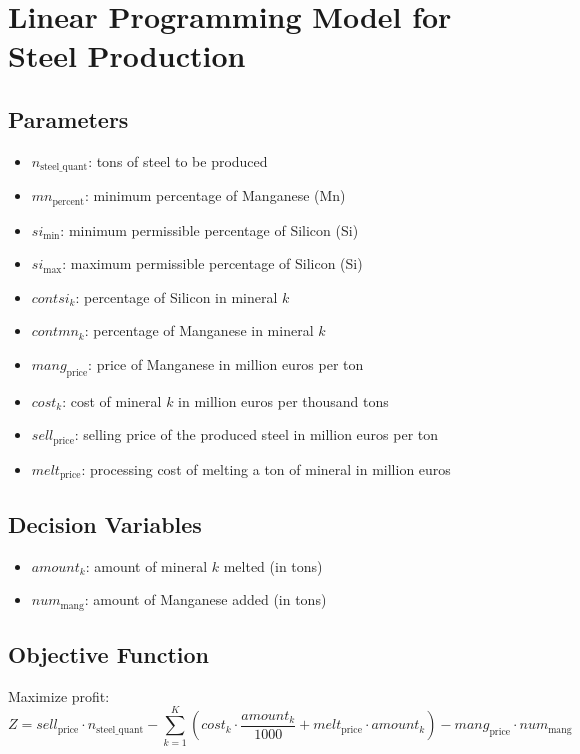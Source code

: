 \documentclass{article}
\begin{document}
\section*{Linear Programming Model for Steel Production}

\subsection*{Parameters}
\begin{itemize}
    \item $n_{\text{steel\_quant}}$: tons of steel to be produced
    \item $mn_{\text{percent}}$: minimum percentage of Manganese (Mn)
    \item $si_{\text{min}}$: minimum permissible percentage of Silicon (Si)
    \item $si_{\text{max}}$: maximum permissible percentage of Silicon (Si)
    \item $contsi_k$: percentage of Silicon in mineral $k$
    \item $contmn_k$: percentage of Manganese in mineral $k$
    \item $mang_{\text{price}}$: price of Manganese in million euros per ton
    \item $cost_k$: cost of mineral $k$ in million euros per thousand tons
    \item $sell_{\text{price}}$: selling price of the produced steel in million euros per ton
    \item $melt_{\text{price}}$: processing cost of melting a ton of mineral in million euros
\end{itemize}

\subsection*{Decision Variables}
\begin{itemize}
    \item $amount_k$: amount of mineral $k$ melted (in tons)
    \item $num_{\text{mang}}$: amount of Manganese added (in tons)
\end{itemize}

\subsection*{Objective Function}
Maximize profit:
\[
Z = sell_{\text{price}} \cdot n_{\text{steel\_quant}} - \sum_{k=1}^{K} (cost_k \cdot \frac{amount_k}{1000} + melt_{\text{price}} \cdot amount_k) - mang_{\text{price}} \cdot num_{\text{mang}}
\]
\end{document}
